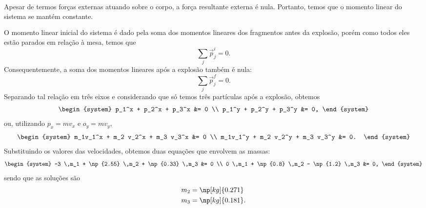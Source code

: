 \begin{marginfigure}
\centering
{}
\caption{Apesar de termos forças externas atuando sobre o corpo, a força resultante externa é nula. Portanto, temos que o momento linear do sistema se mantém constante.}
\end{marginfigure}

\noindent{}O momento linear inicial do sistema é dado pela soma dos momentos lineares dos fragmentos antes da explosão, porém como todos eles estão parados em relação à mesa, temos que
\begin{equation}
    \sum_j \vec{p}_j^i = 0.
\end{equation}
%
Consequentemente, a soma dos momentos lineares após a explosão também é nula:
\begin{equation}
    \sum_j \vec{p}_j^f = 0.
\end{equation}
%
Separando tal relação em três eixos e considerando que só temos três partículas após a explosão, obtemos
\begin{equation}
\begin{system}
    p_1^x + p_2^x + p_3^x &= 0 \\
    p_1^y + p_2^y + p_3^y &= 0,
\end{system}
\end{equation}
%
ou, utilizando $p_x = m v_x$ e $o_y = mv_y$,
\begin{equation}
\begin{system}
    m_1v_1^x + m_2 v_2^x + m_3 v_3^x &= 0 \\
    m_1v_1^y + m_2 v_2^y + m_3 v_3^y &= 0.
\end{system}
\end{equation}
%
Substituindo os valores das velocidades, obtemos duas equações que envolvem as massas:
\begin{equation}
\begin{system}
    -3 \,m_1 + \np{2.55} \,m_2 + \np{0.33} \,m_3 &= 0 \\
    0 \,m_1 + \np{0.8} \,m_2 - \np{1.2} \,m_3 &= 0,
\end{system}
\end{equation}
%
sendo que as soluções são
\begin{align}
    m_2 &= \np[kg]{0.271} \\
    m_3 &= \np[kg]{0.181}.
\end{align}

